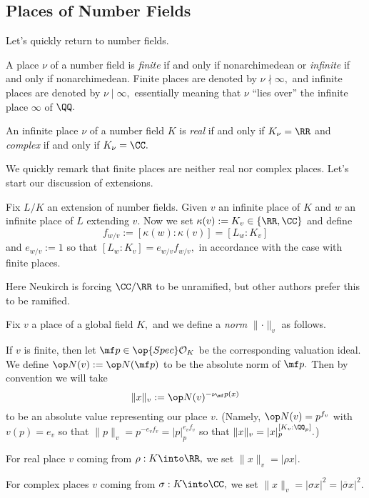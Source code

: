 \subsection{Places of Number Fields}
Let's quickly return to number fields.
\begin{definition}
	A place $\nu$ of a number field is \textit{finite} if and only if nonarchimedean or \textit{infinite} if and only if nonarchimedean. Finite places are denoted by $\nu\nmid\infty,$ and infinite places are denoted by $\nu\mid\infty,$ essentially meaning that $\nu$ ``lies over'' the infinite place $\infty$ of $\QQ.$
\end{definition}
\begin{definition}
	An infinite place $\nu$ of a number field $K$ is \textit{real} if and only if $K_\nu=\RR$ and \textit{complex} if and only if $K_\nu=\CC.$
\end{definition}
We quickly remark that finite places are neither real nor complex places. Let's start our discussion of extensions.
\begin{definition}
	Fix $L/K$ an extension of number fields. Given $v$ an infinite place of $K$ and $w$ an infinite place of $L$ extending $v.$ Now we set $\kappa(v):=K_v\in\{\RR,\CC\}$ and define
	\[f_{w/v}:=[\kappa(w):\kappa(v)]=[L_w:K_v]\]
	and $e_{w/v}:=1$ so that $[L_w:K_v]=e_{w/v}f_{w/v},$ in accordance with the case with finite places.
\end{definition}
\begin{warn}
	Here Neukirch is forcing $\CC/\RR$ to be unramified, but other authors prefer this to be ramified.
\end{warn}
\begin{definition}
	Fix $v$ a place of a global field $K,$ and we define a \textit{norm} $\lVert\cdot\rVert_v$ as follows.
	\begin{listalph}
		\item If $v$ is finite, then let $\mf p\in\op{Spec}\mathcal O_K$ be the corresponding valuation ideal. We define $\op N(v):=\op N(\mf p)$ to be the absolute norm of $\mf p.$ Then by convention we will take
		\[\lVert x\rVert_v:=\op N(v)^{-\nu_\mf p(x)}\]
		to be an absolute value representing our place $v.$ (Namely, $\op N(v)=p^{f_v}$ with $v(p)=e_v$ so that $\lVert p\rVert_v=p^{-e_vf_v}=|p|_p^{e_vf_v}$ so that $\lVert x\rVert_v=|x|_p^{[K_v:\QQ_p]}.$)
		\item For real place $v$ coming from $\rho:K\into\RR,$ we set $\lVert x\rVert_v=|\rho x|.$
		\item For complex places $v$ coming from $\sigma:K\into\CC,$ we set $\lVert x\rVert_v=|\sigma x|^2=|\overline\sigma x|^2.$
	\end{listalph}
\end{definition}
